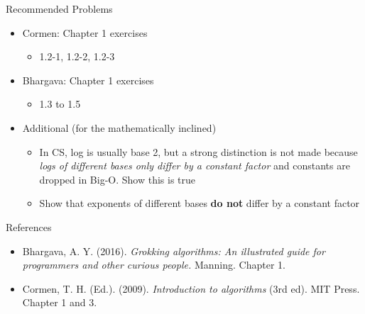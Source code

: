 \documentclass[
  ignorenonframetext,
]{beamer}
\providecommand{\tightlist}{%
  \setlength{\itemsep}{0pt}\setlength{\parskip}{0pt}}\usepackage{longtable,booktabs,array}
\begin{document}
\begin{frame}{Recommended Problems}
\protect\hypertarget{recommended-problems}{}
\begin{itemize}
\item
  Cormen: Chapter 1 exercises

  \begin{itemize}
  \tightlist
  \item
    1.2-1, 1.2-2, 1.2-3
  \end{itemize}
\item
  Bhargava: Chapter 1 exercises

  \begin{itemize}
  \tightlist
  \item
    1.3 to 1.5
  \end{itemize}
\item
  Additional (for the mathematically inclined)

  \begin{itemize}
  \item
    In CS, log is usually base 2, but a strong distinction is not made
    because \emph{logs of different bases only differ by a constant
    factor} and constants are dropped in Big-O. Show this is true
  \item
    Show that exponents of different bases \textbf{do not} differ by a
    constant factor
  \end{itemize}
\end{itemize}
\end{frame}

\begin{frame}{References}
\protect\hypertarget{references}{}
\begin{itemize}
\item
  Bhargava, A. Y. (2016). \emph{Grokking algorithms: An illustrated
  guide for programmers and other curious people.} Manning. Chapter 1.
\item
  Cormen, T. H. (Ed.). (2009). \emph{Introduction to algorithms} (3rd
  ed). MIT Press. Chapter 1 and 3.
\end{itemize}
\end{frame}
\end{document}
